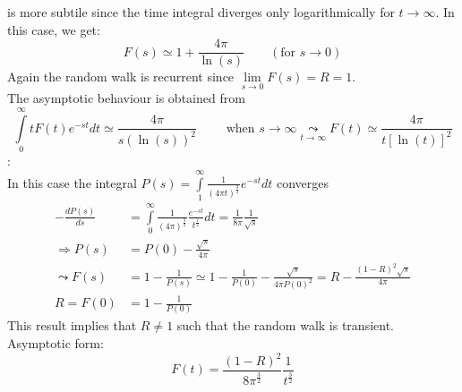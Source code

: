 \textbf{\underline{}} is more subtile since the time integral diverges only logarithmically for $t\to\infty$. In this case, we get:
\begin{equation*}
	F(s)\simeq 1+\frac{4\pi}{\ln(s)} \qquad (\text{for $s\to 0$})
\end{equation*}
Again the random walk is recurrent since $\lim\limits_{s\to 0} F(s)=R=1$.\\
The asymptotic behaviour is obtained from
\begin{equation*}
	\int\limits_0^\infty tF(t)e^{-st}dt\simeq\frac{4\pi}{s\left(\ln(s)\right)^2} \qquad \text{ when } s\to\infty \underset{t\to\infty}{\leadsto}F(t)\simeq\frac{4\pi}{t\left[\ln(t)\right]^2}
\end{equation*}\vspace{0.2cm}
\textbf{\underline{}}:\vspace{0.2cm}\\
In this case the integral $P(s)=\int\limits_1^\infty\frac{1}{\left(4\pi t\right)^\frac{3}{2}}e^{-st}dt$ converges
\begin{align*}
	-\frac{dP(s)}{ds}&=\int\limits_0^\infty \frac{1}{\left(4\pi\right)^\frac{3}{2}}\frac{e^{-st}}{t^\frac{1}{2}}dt=\frac{1}{8\pi}\frac{1}{\sqrt{s}}\\
	\Rightarrow P(s)&=P(0)-\frac{\sqrt{s}}{4\pi}\\
	\leadsto F(s)&=1-\frac{1}{P(s)}\simeq 1-\frac{1}{P(0)}-\frac{\sqrt{s}}{4\pi P(0)^2}=R-\frac{\left(1-R\right)^2\sqrt{s}}{4\pi}\\
	R=F(0)&=1-\frac{1}{P(0)}
\end{align*}
This result implies that $R\neq 1$ such that the random walk is transient.\\
Asymptotic form:
\begin{equation*}
	F(t)=\frac{\left(1-R\right)^2}{8\pi^\frac{3}{2}}\frac{1}{t^\frac{3}{2}}
\end{equation*}

